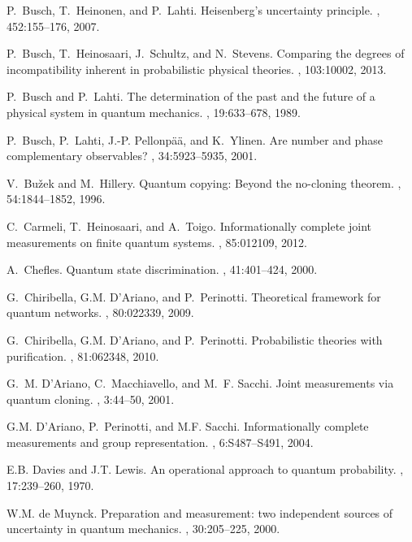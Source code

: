 \documentclass[12pt]{iopart}
\theoremstyle{definition}
\begin{document}
{\begin{thebibliography}{10}
P.~Busch, T.~Heinonen, and P.~Lahti.
\newblock Heisenberg's uncertainty principle.
, 452:155--176, 2007.

P.~Busch, T.~Heinosaari, J.~Schultz, and N.~Stevens.
\newblock Comparing the degrees of incompatibility inherent in probabilistic
  physical theories.
, 103:10002, 2013.

P.~Busch and P.~Lahti.
\newblock The determination of the past and the future of a physical system in
  quantum mechanics.
, 19:633--678, 1989.

P.~Busch, P.~Lahti, J.-P. Pellonp{\"a}{\"a}, and K.~Ylinen.
\newblock Are number and phase complementary observables?
, 34:5923--5935, 2001.

V.~Bu\v{z}ek and M.~Hillery.
\newblock Quantum copying: {B}eyond the no-cloning theorem.
, 54:1844--1852, 1996.

C.~Carmeli, T.~Heinosaari, and A.~Toigo.
\newblock Informationally complete joint measurements on finite quantum
  systems.
, 85:012109, 2012.

A.~Chefles.
\newblock Quantum state discrimination.
, 41:401--424, 2000.

G.~Chiribella, G.M. D'Ariano, and P.~Perinotti.
\newblock Theoretical framework for quantum networks.
, 80:022339, 2009.

G.~Chiribella, G.M. D'Ariano, and P.~Perinotti.
\newblock Probabilistic theories with purification.
, 81:062348, 2010.

G.~M. D'Ariano, C.~Macchiavello, and M.~F. Sacchi.
\newblock Joint measurements via quantum cloning.
, 3:44--50, 2001.

G.M. D'Ariano, P.~Perinotti, and M.F. Sacchi.
\newblock Informationally complete measurements and group representation.
, 6:S487--S491, 2004.

E.B. Davies and J.T. Lewis.
\newblock An operational approach to quantum probability.
, 17:239--260, 1970.

W.M. {de Muynck}.
\newblock Preparation and measurement: two independent sources of uncertainty
  in quantum mechanics.
, 30:205--225, 2000.


\end{thebibliography}}
\end{document}

